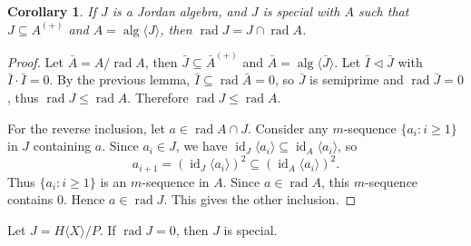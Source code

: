 \documentclass{article}
\newtheorem{corollary}[theorem]{Corollary}
\begin{document}
\begin{corollary}
If $J$ is a Jordan algebra, and $J$ is special with $A$ such that $J \subseteq A^{(+)}$ and $A = \operatorname{alg}\langle J\rangle$, then $\operatorname{rad} J = J \cap \operatorname{rad} A$.
\end{corollary}

\begin{proof}
Let $\bar{A}=A/\operatorname{rad}A$, then $\bar{J}\subseteq\bar{A}^{(+)}$ and $\bar{A}=\operatorname{alg}\langle\bar{J}\rangle$. Let $\bar{I}\triangleleft\bar{J}$ with $\bar{I}\cdot\bar{I}=0$. By the previous lemma, $\bar{I}\subseteq\operatorname{rad}\bar{A}=0$, so $\bar{J}$ is semiprime and $\operatorname{rad}\bar{J}=0$, thus $\operatorname{rad}J\leq\operatorname{rad}A$. Therefore $\operatorname{rad}J\leq\operatorname{rad}A$.

For the reverse inclusion, let $a\in\operatorname{rad}A\cap J$. Consider any $m$-sequence $\{a_i:i\geq1\}$ in $J$ containing $a$. Since $a_i\in J$, we have $\operatorname{id}_J\langle a_i\rangle\subseteq\operatorname{id}_A\langle a_i\rangle$, so
\[
a_{i+1}=(\operatorname{id}_J\langle a_i\rangle)^2\subseteq(\operatorname{id}_A\langle a_i\rangle)^2.
\]
Thus $\{a_i:i\geq1\}$ is an $m$-sequence in $A$. Since $a\in\operatorname{rad}A$, this $m$-sequence contains $0$. Hence $a\in\operatorname{rad}J$. This gives the other inclusion.
\end{proof}

\begin{theorem}
Let $J=H\langle X\rangle/P$. If $\operatorname{rad}J=0$, then $J$ is special.
\end{theorem}
\end{document}
